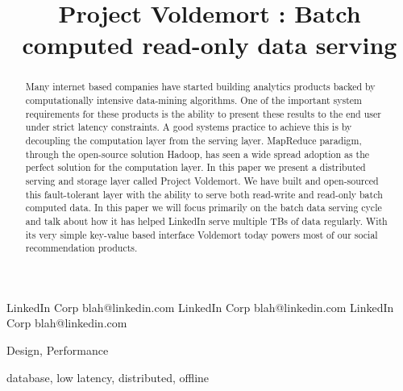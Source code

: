 \documentclass[10pt,twocolumn,preprint,natbib,authoryear]{sigplanconf}
\begin{document}
\copyrightdata{[to be supplied]} 


\title{Project Voldemort : Batch computed read-only data serving}

           {LinkedIn Corp}
           {blah@linkedin.com}
           {LinkedIn Corp}
           {blah@linkedin.com}
           {LinkedIn Corp}
           {blah@linkedin.com}


				
\maketitle

\begin{abstract}
Many internet based companies have started building analytics products backed by computationally intensive data-mining algorithms. One of the important system requirements for these products is the ability to present these results to the end user under strict latency constraints. A good systems practice to achieve this is by decoupling the computation layer from the serving layer. MapReduce paradigm, through the open-source solution Hadoop, has seen a wide spread adoption as the perfect solution for the computation layer. In this paper we present a distributed serving and storage layer called Project Voldemort. We have built and open-sourced this fault-tolerant layer with the ability to serve both read-write and read-only batch computed data. In this paper we will focus primarily on the batch data serving cycle and talk about how it has helped LinkedIn serve multiple TBs of data regularly. With its very simple key-value based interface Voldemort today powers most of our social recommendation products. 
\end{abstract}


\terms
Design, Performance

\keywords
database, low latency, distributed, offline
\end{document}
